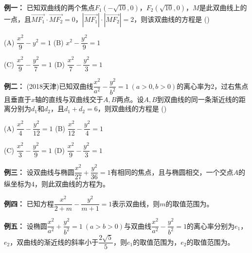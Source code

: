 \documentclass{article}
\begin{document}
\noindent\textbf{例一： }已知双曲线的两个焦点$F_1\left(-\sqrt{10},0\right)$，$F_2\left(\sqrt{10},0\right)$，$M$是此双曲线上的一点，且$\overrightarrow{MF_1}\cdot\overrightarrow{MF_2}=0$，$\left|\overrightarrow{MF_1}\right|\cdot\left|\overrightarrow{MF_2}\right|=2$，则该双曲线的方程是 \hspace{1em} (\hspace{2em})
\par (A) $\dfrac{x^2}{9} - y^2 = 1$ \hspace{2em} (B) $x^2 - \dfrac{y^2}{9} = 1$
\par (C) $\dfrac{x^2}{9} - \dfrac{y^2}{7} = 1$ \hspace{2em} (D) $\dfrac{x^2}{7} - \dfrac{y^2}{3} = 1$
\vspace{2\baselineskip}

\noindent\textbf{例二： }(2018天津)已知双曲线$\dfrac{x^2}{a^2}-\dfrac{y^2}{b^2}=1\ (a>0,b>0)$的离心率为$2$，过右焦点且垂直于$x$轴的直线与双曲线交于$A,B$两点。设$A,B$到双曲线的同一条渐近线的距离分别为$d_1$和$d_2$，且$d_1+d_2=6$，则双曲线的方程是 \hspace{1em} (\hspace{2em})
\par (A) $\dfrac{x^2}{4} - \dfrac{y^2}{12} = 1$ \hspace{2em} (B) $\dfrac{x^2}{12} - \dfrac{y^2}{4} = 1$
\par (C) $\dfrac{x^2}{3} - \dfrac{y^2}{9} = 1$ \hspace{2em} (D) $\dfrac{x^2}{9} - \dfrac{y^2}{3} = 1$
\vspace{2\baselineskip}

\noindent\textbf{例三： }设双曲线与椭圆$\dfrac{x^2}{27}+\dfrac{y^2}{36}=1$有相同的焦点，且与椭圆相交，一个交点$A$的纵坐标为$4$，则此双曲线的方程为\underline{\hspace{5em}}。
\vspace{2\baselineskip}

\noindent\textbf{例四： }已知方程$\dfrac{x^2}{2+m}-\dfrac{y^2}{m+1}=1$表示双曲线，则$m$的取值范围为\underline{\hspace{5em}}。
\vspace{2\baselineskip}

\noindent\textbf{例五： }设椭圆$\dfrac{x^2}{a^2}+\dfrac{y^2}{b^2}=1\ (a>b>0)$与双曲线$\dfrac{x^2}{a^2}-\dfrac{y^2}{b^2}=1$的离心率分别为$e_1$，$e_2$，双曲线的渐近线的斜率小于$\dfrac{2\sqrt{5}}{5}$，则$e_1$的取值范围为\underline{\hspace{5em}}，$e_2$的取值范围为\underline{\hspace{5em}}。
\vspace{2\baselineskip}
\end{document}
